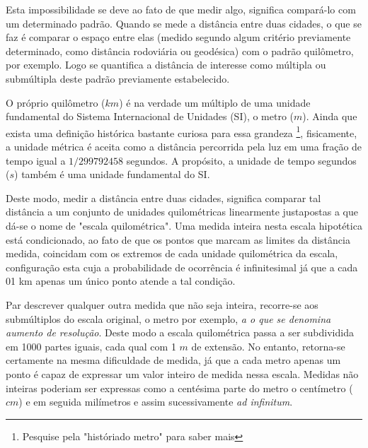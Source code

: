 \documentclass[a4paper, 11pt]{report}
\begin{document}
Esta impossibilidade se deve ao fato de que medir algo, significa compará-lo com
um determinado padrão. Quando se mede a distância entre duas cidades, o que se 
faz é comparar o espaço entre elas (medido segundo algum critério previamente
determinado, como distância rodoviária ou geodésica) com o padrão quilômetro, 
por exemplo. Logo se quantifica a distância de interesse como múltipla ou 
submúltipla deste padrão previamente estabelecido.

O próprio quilômetro ($km$) é na verdade um múltiplo de uma unidade fundamental 
do Sistema Internacional de Unidades (SI), o metro ($m$). Ainda que exista uma 
definição histórica bastante curiosa para essa grandeza \footnote{Pesquise pela 
"históriado metro" para saber mais}, fisicamente, a unidade métrica é aceita 
como a distância percorrida pela luz em uma fração de tempo igual a 
$1/299 792 458$ segundos. A propósito, a unidade de tempo segundos ($s$) também 
é uma unidade fundamental do SI. 

Deste modo, medir a distância entre duas cidades, significa comparar tal
distância a um conjunto de unidades quilométricas linearmente justapostas a que
dá-se o nome de "escala quilométrica". Uma medida inteira nesta escala hipotética
está condicionado, ao fato de que os pontos que marcam as limites da distância 
medida, coincidam com os extremos de cada unidade quilométrica da escala, 
configuração esta cuja a probabilidade de ocorrência é infinitesimal já que a 
cada 01 km apenas um único ponto atende a tal condição. 

Par descrever qualquer outra medida que não seja inteira, recorre-se aos 
submúltiplos do escala original, o metro por exemplo, \emph{a o que se denomina 
aumento de resolução}. Deste modo a escala quilométrica passa a ser subdividida 
em 1000 partes iguais,  cada qual com 1 $m$ de extensão. No entanto, retorna-se 
certamente na mesma dificuldade de medida, já que a cada metro apenas um ponto 
é capaz de expressar um valor inteiro de medida nessa escala. Medidas não 
inteiras poderiam ser expressas como a centésima parte do metro o centímetro 
($cm$) e em seguida milímetros e assim sucessivamente \emph{ad infinitum}. 
\end{document}
